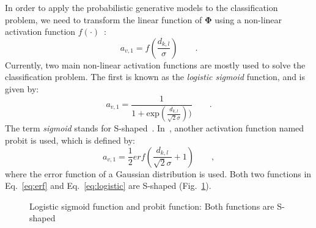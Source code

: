 In order to apply the probabilistic generative models to the
classification problem,
we need to transform the linear function of $\mathbf{\Phi}$ using a
non-linear activation function $f(\cdot)$~\cite{bishop2006pattern}:
\begin{equation}
  \label{eq:nonla}
  a_{v,1} = f(\frac{d_{k,l}}{\sigma})\qquad.
\end{equation}
Currently, two main non-linear activation functions are mostly used
to solve the classification problem. The first is known as the
\textit{logistic sigmoid} function, and is given by:
\begin{equation}
  \label{eq:logistic}
  a_{v,1} =
  \frac{1}{1+\mathrm{exp}(\frac{d_{k,l}}{\sqrt{2}\sigma}))}\qquad .
\end{equation}
The term \textit{sigmoid} stands for
S-shaped~\cite{bishop2006pattern}. In~\cite{hanek2004contracting},
another activation function named probit is used, which is defined by:
\begin{equation}
  \label{eq:erf}
  a_{v,1} = \frac{1}{2}erf(\frac{d_{k,l}}{\sqrt{2}\sigma} + 1)\qquad ,
\end{equation}
where the error function of a Gaussian distribution is used. Both
two functions in Eq.~\ref{eq:erf} and Eq.~\ref{eq:logistic} are
S-shaped (Fig.~\ref{fig:s-shaped}).
\begin{figure} 
  \begin{minipage}[t]{0.5\linewidth} 
    \centering 
  \end{minipage}%
  \begin{minipage}[t]{0.5\linewidth} 
    \centering 
  \end{minipage} 
\caption[Logistic sigmoid function and probit function]{Logistic
  sigmoid function and probit function: Both functions
  are S-shaped}
\label{fig:s-shaped}
\end{figure}

